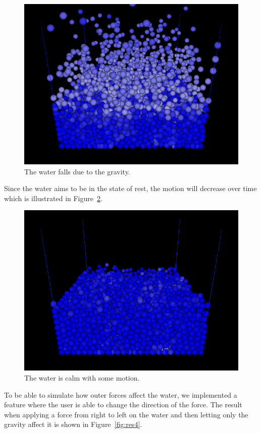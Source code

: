 	\begin{figure}[h!]
		\includegraphics[width=\linewidth]{img/frame0139.png}
		\caption{The water falls due to the gravity.}
		\label{fig:res2}
	\end{figure}

	Since the water aims to be in the state of rest, the motion will decrease over time which is illustrated in Figure~\ref{fig:res3}.
	\begin{figure}[h!]
		\includegraphics[width=\linewidth]{img/frame0500.png}
		\caption{The water is calm with some motion.}
		\label{fig:res3}
	\end{figure}

	To be able to simulate how outer forces affect the water, we implemented a feature where the user is able to change the direction of the force.
	The result when applying a force from right to left on the water and then letting only the gravity affect it is shown in Figure~\ref{fig:res4}.

